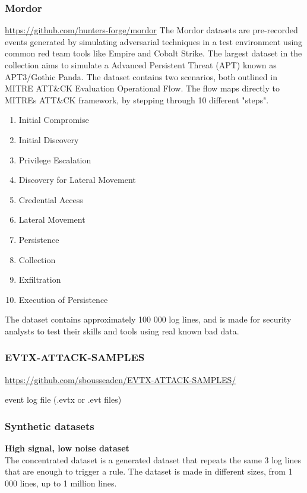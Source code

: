 \subsubsection{Mordor}
\url{https://github.com/hunters-forge/mordor}
The Mordor datasets are pre-recorded events generated by simulating adversarial techniques in a test environment using common red team tools like Empire and Cobalt Strike. The largest dataset in the collection aims to simulate a Advanced Persistent Threat (APT) known as APT3/Gothic Panda. The dataset contains two scenarios, both outlined in MITRE ATT\&CK Evaluation Operational Flow. The flow maps directly to MITREs ATT\&CK framework, by stepping through 10 different "steps".

\begin{enumerate}
\item Initial Compromise
\item Initial Discovery
\item Privilege Escalation
\item Discovery for Lateral Movement
\item Credential Access
\item Lateral Movement
\item Persistence
\item Collection
\item Exfiltration
\item Execution of Persistence
\end{enumerate}

The dataset contains approximately 100 000 log lines, and is made for security analysts to test their skills and tools using real known bad data.

\subsubsection{EVTX-ATTACK-SAMPLES}
\url{https://github.com/sbousseaden/EVTX-ATTACK-SAMPLES/}

event log file (.evtx or .evt files) \cite{windows_events_docs}

\subsubsection{Synthetic datasets}

\textbf{High signal, low noise dataset}\\
The concentrated dataset is a generated dataset that repeats the same 3 log lines that are enough to trigger a rule. The dataset is made in different sizes, from 1 000 lines, up to 1 million lines.

